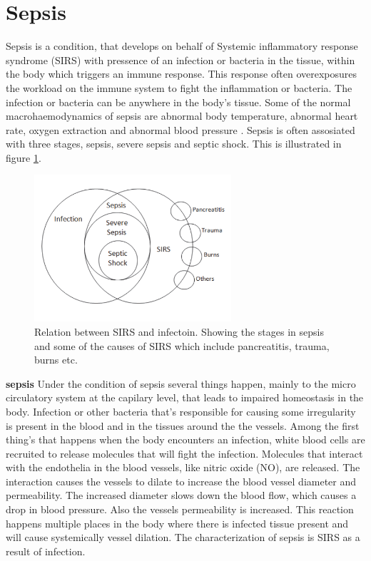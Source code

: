\section{Sepsis}

Sepsis is a condition, that develops on behalf of Systemic inflammatory response syndrome (SIRS) with pressence of an infection or bacteria in the tissue, within the body which triggers an immune response. This response often overexposures the workload on the immune system to fight the inflammation or bacteria. The infection or bacteria can be anywhere in the body’s tissue. Some of the normal macrohaemodynamics of sepsis are abnormal body temperature, abnormal heart rate, oxygen extraction and abnormal blood pressure \cite{plunta2010,kanta2014}.
Sepsis is often assosiated with three stages, sepsis, severe sepsis and septic shock. This is illustrated in figure \ref{fig:Sepsis_stages}.

\begin{figure}[H]
	\centering	\includegraphics[width=0.65\textwidth]{figures/Sepsis_stages}
	\caption{Relation between SIRS and infectoin. Showing the stages in sepsis and some of the causes of SIRS which include pancreatitis, trauma, burns etc.}
	\label{fig:Sepsis_stages}
\end{figure} \vspace{-.3cm}

\textbf{sepsis}
Under the condition of sepsis several things happen, mainly to the micro circulatory system at the capilary level, that leads to impaired homeostasis in the body. Infection or other bacteria that’s responsible for causing some irregularity is present in the blood and in the tissues around the the vessels. Among the first thing’s that happens when the body encounters an infection, white blood cells are recruited to release molecules that will fight the infection. Molecules that interact with the endothelia in the blood vessels, like nitric oxide (NO), are released. The interaction causes the vessels to dilate to increase the blood vessel diameter and permeability. The increased diameter slows down the blood flow, which causes a drop in blood pressure. Also the vessels permeability is increased. This reaction happens multiple places in the body where there is infected tissue present and will cause systemically vessel dilation. The characterization of sepsis is SIRS as a result of infection. \cite{baudouin200,kanta2014}

